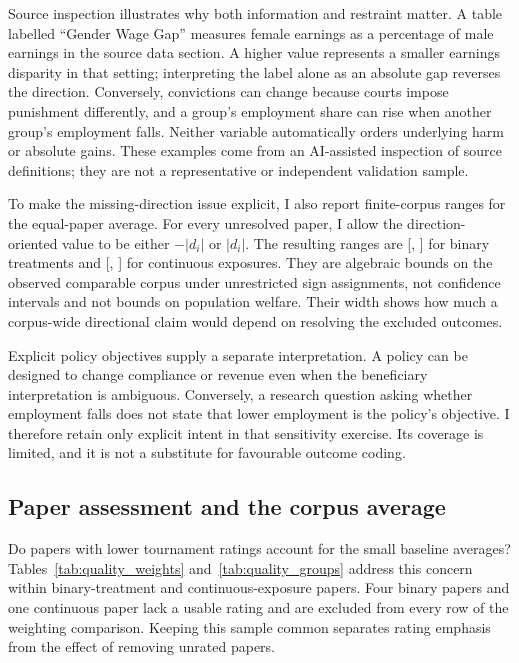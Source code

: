 \documentclass[11pt]{article}
\begin{document}
Source inspection illustrates why both information and restraint matter. A table labelled ``Gender Wage Gap'' measures female earnings as a percentage of male earnings in the source data section. A higher value represents a smaller earnings disparity in that setting; interpreting the label alone as an absolute gap reverses the direction. Conversely, convictions can change because courts impose punishment differently, and a group's employment share can rise when another group's employment falls. Neither variable automatically orders underlying harm or absolute gains. These examples come from an AI-assisted inspection of source definitions; they are not a representative or independent validation sample.

To make the missing-direction issue explicit, I also report finite-corpus ranges for the equal-paper average. For every unresolved paper, I allow the direction-oriented value to be either $-|d_i|$ or $|d_i|$. The resulting ranges are [\BinaryMissingLo{}, \BinaryMissingHi{}] for binary treatments and [\ContinuousMissingLo{}, \ContinuousMissingHi{}] for continuous exposures. They are algebraic bounds on the observed comparable corpus under unrestricted sign assignments, not confidence intervals and not bounds on population welfare. Their width shows how much a corpus-wide directional claim would depend on resolving the excluded outcomes.

Explicit policy objectives supply a separate interpretation. A policy can be designed to change compliance or revenue even when the beneficiary interpretation is ambiguous. Conversely, a research question asking whether employment falls does not state that lower employment is the policy's objective. I therefore retain only explicit intent in that sensitivity exercise. Its coverage is limited, and it is not a substitute for favourable outcome coding.

\subsection{Paper assessment and the corpus average}
Do papers with lower tournament ratings account for the small baseline averages? Tables~\ref{tab:quality_weights} and~\ref{tab:quality_groups} address this concern within \BinaryRatedDirectionN{} binary-treatment and \ContinuousRatedDirectionN{} continuous-exposure papers. Four binary papers and one continuous paper lack a usable rating and are excluded from every row of the weighting comparison. Keeping this sample common separates rating emphasis from the effect of removing unrated papers.
\end{document}
